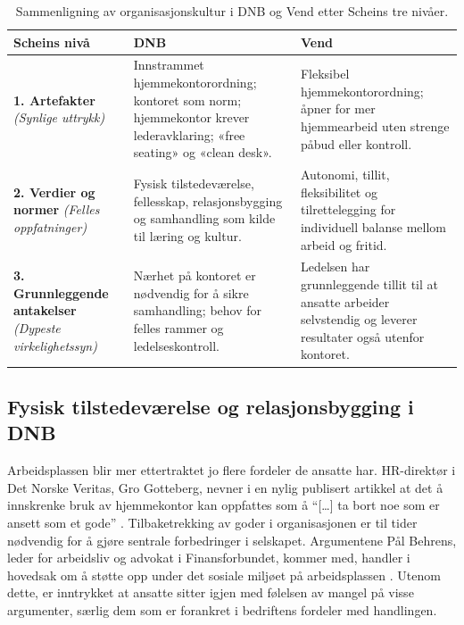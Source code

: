 \begin{table}[h!]
\centering
\small
\renewcommand{\arraystretch}{1.3}
\begin{tabular}{p{3.2cm} p{5.5cm} p{5.5cm}}
\toprule
\textbf{Scheins nivå} & \textbf{DNB} & \textbf{Vend} \\
\midrule
\textbf{1. Artefakter} \newline \textit{(Synlige uttrykk)} & 
Innstrammet hjemmekontorordning; kontoret som norm; hjemmekontor krever lederavklaring; «free seating» og «clean desk». & 
Fleksibel hjemmekontorordning; åpner for mer hjemmearbeid uten strenge påbud eller kontroll. \\
\addlinespace
\textbf{2. Verdier og normer} \newline \textit{(Felles oppfatninger)} & 
Fysisk tilstedeværelse, fellesskap, relasjonsbygging og samhandling som kilde til læring og kultur. & 
Autonomi, tillit, fleksibilitet og tilrettelegging for individuell balanse mellom arbeid og fritid. \\
\addlinespace
\textbf{3. Grunnleggende antakelser} \newline \textit{(Dypeste virkelighetssyn)} & 
Nærhet på kontoret er nødvendig for å sikre samhandling; behov for felles rammer og ledelseskontroll. & 
Ledelsen har grunnleggende tillit til at ansatte arbeider selvstendig og leverer resultater også utenfor kontoret. \\
\bottomrule
\end{tabular}
\caption{Sammenligning av organisasjonskultur i DNB og Vend etter Scheins tre nivåer.}
\label{tab:schein_kultur}
\end{table}

\subsection{Fysisk tilstedeværelse og relasjonsbygging i DNB}

Arbeidsplassen blir mer ettertraktet jo flere fordeler de ansatte har. HR-direktør i Det Norske Veritas, Gro Gotteberg, nevner i en nylig publisert artikkel at det å innskrenke bruk av hjemmekontor kan oppfattes som å \enquote{[\dots] ta bort noe som er ansett som et gode} \parencite{ingebrigtsen_dnv_2026}. Tilbaketrekking av goder i organisasjonen er til tider nødvendig for å gjøre sentrale forbedringer i selskapet. Argumentene Pål Behrens, leder for arbeidsliv og advokat i Finansforbundet, kommer med, handler i hovedsak om å støtte opp under det sosiale miljøet på arbeidsplassen \parencite{biernat2026}. Utenom dette, er inntrykket at ansatte sitter igjen med følelsen av mangel på visse argumenter, særlig dem som er forankret i bedriftens fordeler med handlingen.

